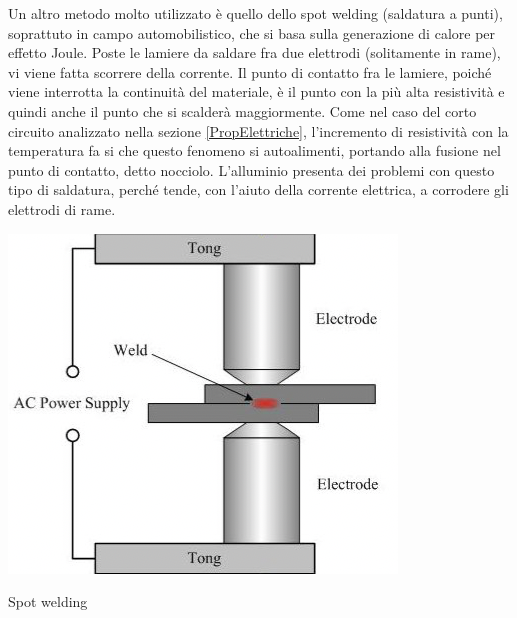 Un altro metodo molto utilizzato è quello dello spot welding (saldatura a punti), soprattuto in campo automobilistico, che si basa sulla generazione di calore per effetto Joule. Poste le lamiere da saldare fra due elettrodi (solitamente in rame), vi viene fatta scorrere della corrente. Il punto di contatto fra le lamiere, poiché viene interrotta la continuità del materiale, è il punto con la più alta resistività e quindi anche il punto che si scalderà maggiormente. Come nel caso del corto circuito analizzato nella sezione \ref{PropElettriche}, l'incremento di resistività con la temperatura fa si che questo fenomeno si autoalimenti, portando alla fusione nel punto di contatto, detto nocciolo.
L'alluminio presenta dei problemi con questo tipo di saldatura, perché tende, con l'aiuto della corrente elettrica, a corrodere gli elettrodi di rame.
\begin{marginfigure}
        \includegraphics{images/img5.png}
        \caption[Spot Welding]{Spot welding}
\end{marginfigure}

